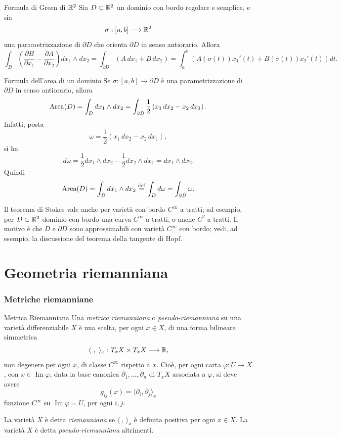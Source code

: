 \documentclass[a4paper]{article}
\begin{document}
\begin{snippetexample}{Formula di Green di \(\mathbb{R}^2\)}
    Sia \(D\subset\mathbb{R}^2\) un dominio con bordo regolare e semplice, e sia
    \[
    \sigma:[a,b]\longrightarrow\mathbb{R}^2
    \]
    una parametrizzazione di \(\partial D\) che orienta \(\partial D\) in senso antiorario. Allora
    \[
    \int_D\left(\frac{\partial B}{\partial x_1}-\frac{\partial A}{\partial x_2}\right)dx_1\wedge dx_2
    =
    \int_{\partial D}(A\,dx_1+B\,dx_2)
    =
    \int_a^b\left(A(\sigma(t))x_1'(t)+B(\sigma(t))x_2'(t)\right)dt.
    \]
\end{snippetexample}

\begin{snippetexample}{Formula dell'area di un dominio}
    Se \(\sigma:[a,b]\to\partial D\) è una parametrizzazione di \(\partial D\) in senso antiorario, allora
    \[
    \operatorname{Area}(D)=\int_D dx_1\wedge dx_2
    =
    \int_{\partial D}\frac12\left(x_1\,dx_2-x_2\,dx_1\right).
    \]
    Infatti, posta
    \[
    \omega=\frac12\left(x_1\,dx_2-x_2\,dx_1\right),
    \]
    si ha
    \[
    d\omega
    =\frac12 dx_1\wedge dx_2-\frac12 dx_2\wedge dx_1
    =dx_1\wedge dx_2.
    \]
    Quindi
    \[
    \operatorname{Area}(D)=\int_D dx_1\wedge dx_2
    \stackrel{\mathrm{def}}{=}
    \int_D d\omega
    =
    \int_{\partial D}\omega.
    \]
\end{snippetexample}

Il teorema di Stokes vale anche per varietà con bordo \(C^\infty\) a tratti; ad esempio, per \(D\subset\mathbb{R}^2\) dominio con bordo una curva \(C^\infty\) a tratti, o anche \(C^2\) a tratti.
Il motivo è che \(D\) e \(\partial D\) sono approssimabili con varietà \(C^\infty\) con bordo; vedi, ad esempio, la discussione del teorema della tangente di Hopf.

\part{Geometria riemanniana}

\section{Metriche riemanniane}

\begin{snippetdefinition}{Metrica Riemanniana}
    Una \emph{metrica riemanniana} o \emph{pseudo-riemanniana} su una varietà differenziabile \(X\) è una scelta, per ogni \(x\in X\), di una forma bilineare simmetrica
    \[
    \langle\ ,\ \rangle_x:T_xX\times T_xX\longrightarrow\realnumbers,
    \]
    non degenere per ogni \(x\), di classe \(C^\infty\) rispetto a \(x\). Cioè, per ogni carta \(\varphi:U\to X\), con \(x\in\operatorname{Im}\varphi\), data la base canonica \(\partial_1,\ldots,\partial_n\) di \(T_xX\) associata a \(\varphi\), si deve avere
    \[
    g_{ij}(x)=\langle\partial_i,\partial_j\rangle_x
    \]
    funzione \(C^\infty\) su \(\operatorname{Im}\varphi=U\), per ogni \(i,j\).

    La varietà \(X\) è detta \emph{riemanniana} se \(\langle\ ,\ \rangle_x\) è definita positiva per ogni \(x\in X\).
    La varietà \(X\) è detta \emph{pseudo-riemanniana} altrimenti.
\end{snippetdefinition}
\end{document}
